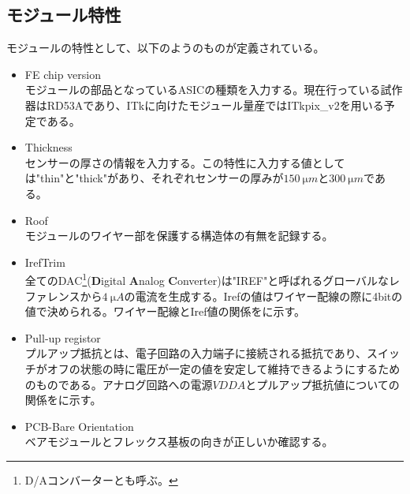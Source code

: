 \subsection{モジュール特性}
\label{sec:module-prop}
モジュールの特性として、以下のようのものが定義されている。
\begin{itemize}
  \item FE chip version \\
  モジュールの部品となっているASICの種類を入力する。現在行っている試作器はRD53Aであり、ITkに向けたモジュール量産ではITkpix\_v2を用いる予定である。
  \item Thickness \\
  センサーの厚さの情報を入力する。この特性に入力する値としては"thin"と"thick"があり、それぞれセンサーの厚みが$150\ \si{\micro m}$と$300\ \si{\micro m}$である。
  \item Roof \\
  モジュールのワイヤー部を保護する構造体の有無を記録する。
  \item IrefTrim\\
  全てのDAC\footnote{D/Aコンバーターとも呼ぶ。}(\textbf{D}igital \textbf{A}nalog \textbf{C}onverter)は"IREF"と呼ばれるグローバルなレファレンスから$4\ \si{\micro A}$の電流を生成する。Irefの値はワイヤー配線の際に4bitの値で決められる。ワイヤー配線とIref値の関係をに示す。
  \item Pull-up registor\\
  プルアップ抵抗とは、電子回路の入力端子に接続される抵抗であり、スイッチがオフの状態の時に電圧が一定の値を安定して維持できるようにするためのものである。アナログ回路への電源$VDDA$とプルアップ抵抗値についての関係をに示す。
  \item PCB-Bare Orientation \\
  ベアモジュールとフレックス基板の向きが正しいか確認する。
\end{itemize}

